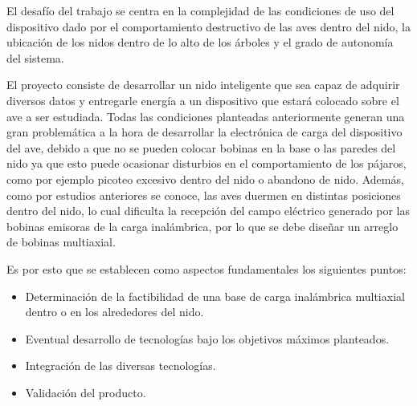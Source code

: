 El desafío del trabajo se centra en la complejidad de las condiciones de uso del dispositivo dado por el comportamiento destructivo de las aves dentro del nido, la ubicación de los nidos dentro de lo alto de los árboles y el grado de autonomía del sistema. 

El proyecto consiste de desarrollar un nido inteligente que sea capaz de adquirir diversos datos y entregarle energía a un dispositivo que estará colocado sobre el ave a ser estudiada. Todas las condiciones planteadas anteriormente generan una gran problemática a la hora de desarrollar la electrónica de carga del dispositivo del ave, debido a que no se pueden colocar bobinas en la base o las paredes del nido ya que esto puede ocasionar disturbios en el comportamiento de los pájaros, como por ejemplo picoteo excesivo dentro del nido o abandono de nido. Además, como por estudios anteriores se conoce, las aves duermen en distintas posiciones dentro del nido, lo cual dificulta la recepción del campo eléctrico generado por las bobinas emisoras de la carga inalámbrica, por lo que se debe diseñar un arreglo de bobinas multiaxial.


Es por esto que se establecen como aspectos fundamentales los siguientes puntos:
\begin{itemize}
	\item Determinación de la factibilidad de una base de carga inalámbrica multiaxial dentro o en los alrededores del nido.
	\item Eventual desarrollo de tecnologías bajo los objetivos máximos planteados.
	\item Integración de las diversas tecnologías.
	\item Validación del producto.
\end{itemize}

